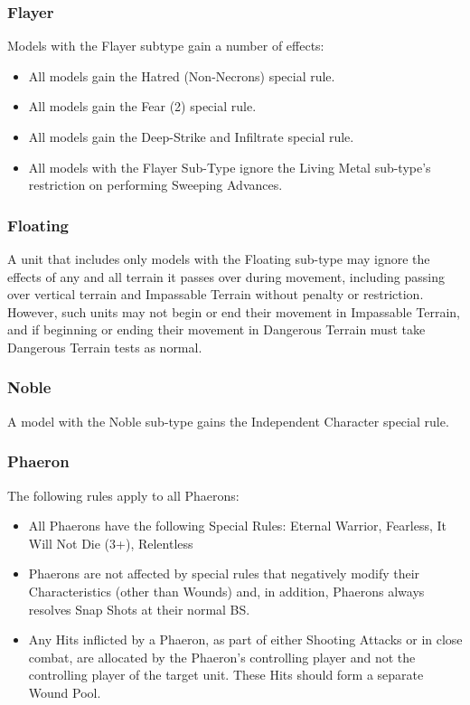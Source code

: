 \subsubsection{Flayer} \label{Flayer}

Models with the Flayer subtype gain a number of effects:

\begin{itemize}
	\item All models gain the Hatred (Non-Necrons) special rule.
	\item All models gain the Fear (2) special rule.
	\item All models gain the Deep-Strike and Infiltrate special rule.
	\item All models with the Flayer Sub-Type ignore the Living Metal sub-type's restriction on performing Sweeping Advances.
\end{itemize}

\subsubsection{Floating} \label{Floating}

A unit that includes only models with the Floating sub-type may ignore the effects of any and all terrain it passes over during movement, including passing over vertical terrain and Impassable Terrain without penalty or restriction. However, such units may not begin or end their movement in Impassable Terrain, and if beginning or ending their movement in Dangerous Terrain must take Dangerous Terrain tests as normal.

\subsubsection{Noble} \label{Noble}

A model with the Noble sub-type gains the Independent Character special rule. \\

\subsubsection{Phaeron} \label{Phaeron}

The following rules apply to all Phaerons:
\begin{itemize}
	\item All Phaerons have the following Special Rules: Eternal Warrior, Fearless, It Will Not Die (3+), Relentless
	\item Phaerons are not affected by special rules that negatively modify their Characteristics (other than Wounds) and, in addition, Phaerons always resolves Snap Shots at their normal BS.
	\item Any Hits inflicted by a Phaeron, as part of either Shooting Attacks or in close combat, are allocated by the Phaeron’s controlling player and not the controlling player of the target unit. These Hits should form a separate Wound Pool.
\end{itemize}
